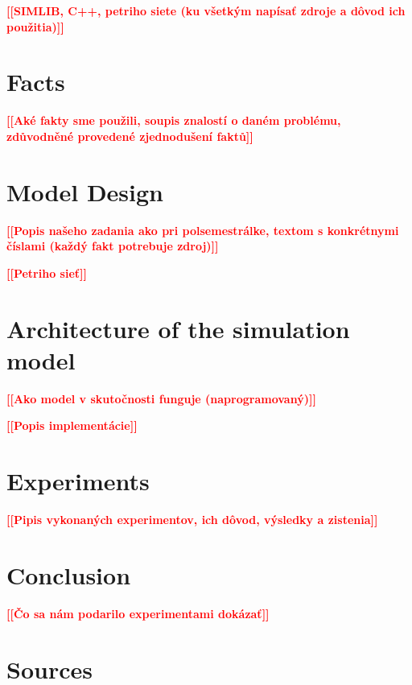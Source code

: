 \documentclass[a4paper, 11pt, a4paper]{article}
\newcommand{\todo}[1]{\textcolor{red}{\textbf{[[#1]]}}}
\begin{document}
\noindent\todo{SIMLIB, C++, petriho siete (ku všetkým napísať zdroje a dôvod ich použitia)}



\section{Facts}

\todo{Aké fakty sme použili, soupis znalostí o daném problému, zdůvodněné provedené zjednodušení faktů}


\section{Model Design}

\noindent\todo{Popis našeho zadania ako pri polsemestrálke, textom s konkrétnymi číslami (každý fakt potrebuje zdroj)}

\noindent\todo{Petriho sieť}


\section{Architecture of the simulation model}

\noindent\todo{Ako model v skutočnosti funguje (naprogramovaný)}

\noindent\todo{Popis implementácie}


\section{Experiments}

\todo{Pipis vykonaných experimentov, ich dôvod, výsledky a zistenia}


\section{Conclusion}

\todo{Čo sa nám podarilo experimentami dokázať}


\newpage


\section{Sources}

\end{document}

